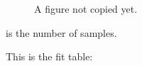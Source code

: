 \documentclass{article}
\begin{document}
\begin{figure}[h]
    \centering
    \caption{A figure not copied yet.}
\end{figure}

\begin{table}[h]
    \centering
    \caption{A table from the project.}
\end{table}


 is the number of samples.

This is the fit table:
\end{document}

